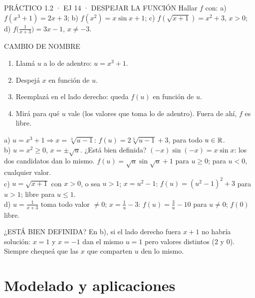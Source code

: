 \begin{enunciado}{PRÁCTICO 1.2 · EJ 14 · DESPEJAR LA FUNCIÓN}
Hallar $f$ con: a) $f(x^3+1)=2x+3$; b) $f(x^2)=x\sin x+1$; c) $f(\sqrt{x+1})=x^2+3$, $x>0$; d) $f\big(\frac1{x+3}\big)=3x-1$, $x\neq-3$.
\end{enunciado}
\begin{metodo}{CAMBIO DE NOMBRE}
\begin{enumerate}
\item Llamá $u$ a lo de adentro: $u=x^3+1$.
\item Despejá $x$ en función de $u$.
\item Reemplazá en el lado derecho: queda $f(u)$ en función de $u$.
\item Mirá para qué $u$ vale (los valores que toma lo de adentro). Fuera de ahí, $f$ es libre.
\end{enumerate}
\end{metodo}
a) $u=x^3+1\Rightarrow x=\sqrt[3]{u-1}$: $f(u)=2\sqrt[3]{u-1}+3$, para todo $u\in\mathbb{R}$.\\[2pt]
b) $u=x^2\ge0$, $x=\pm\sqrt u$. ¿Está bien definida? $(-x)\sin(-x)=x\sin x$: los dos candidatos dan lo mismo. $f(u)=\sqrt u\sin\sqrt u+1$ para $u\ge0$; para $u<0$, cualquier valor.\\[2pt]
c) $u=\sqrt{x+1}$ con $x>0$, o sea $u>1$; $x=u^2-1$: $f(u)=(u^2-1)^2+3$ para $u>1$; libre para $u\le1$.\\[2pt]
d) $u=\frac1{x+3}$ toma todo valor $\neq0$; $x=\frac1u-3$: $f(u)=\frac3u-10$ para $u\neq0$; $f(0)$ libre.
\begin{trampa}{¿ESTÁ BIEN DEFINIDA?}
En b), si el lado derecho fuera $x+1$ no habría solución: $x=1$ y $x=-1$ dan el mismo $u=1$ pero valores distintos (2 y 0). Siempre chequeá que las $x$ que comparten $u$ den lo mismo.
\end{trampa}

\section{Modelado y aplicaciones}

